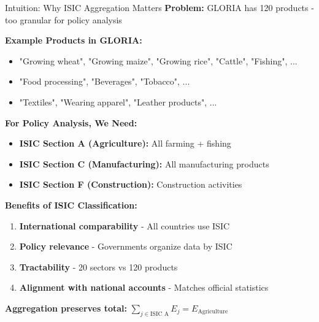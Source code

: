 \documentclass[10pt]{beamer}
\begin{document}
\begin{frame}{Intuition: Why ISIC Aggregation Matters}
\textbf{Problem:} GLORIA has 120 products - too granular for policy analysis

\vspace{0.3cm}

\textbf{Example Products in GLORIA:}
\begin{itemize}
    \item "Growing wheat", "Growing maize", "Growing rice", "Cattle", "Fishing", ...
    \item "Food processing", "Beverages", "Tobacco", ...
    \item "Textiles", "Wearing apparel", "Leather products", ...
\end{itemize}

\vspace{0.3cm}

\textbf{For Policy Analysis, We Need:}
\begin{itemize}
    \item \textbf{ISIC Section A (Agriculture):} All farming + fishing
    \item \textbf{ISIC Section C (Manufacturing):} All manufacturing products
    \item \textbf{ISIC Section F (Construction):} Construction activities
\end{itemize}

\vspace{0.3cm}

\textbf{Benefits of ISIC Classification:}
\begin{enumerate}
    \item \textbf{International comparability} - All countries use ISIC
    \item \textbf{Policy relevance} - Governments organize data by ISIC
    \item \textbf{Tractability} - 20 sectors vs 120 products
    \item \textbf{Alignment with national accounts} - Matches official statistics
\end{enumerate}

\vspace{0.3cm}

\textbf{Aggregation preserves total:} $\sum_{j \in \text{ISIC A}} E_j = E_{\text{Agriculture}}$

\end{frame}
\end{document}
